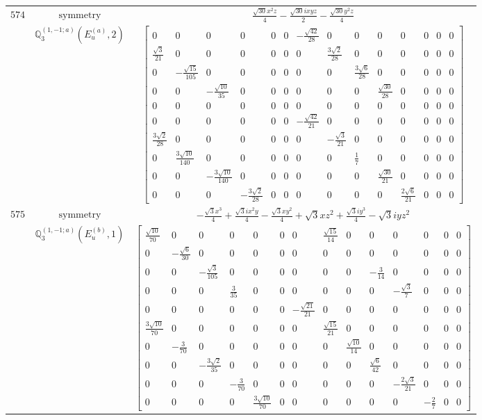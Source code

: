 \documentclass[fleqn,8pt,landscape]{jsarticle}
\begin{document}
\begin{longtable}{ccc}
$ 574 $ & $ \text{symmetry} $ & $ \frac{\sqrt{30} x^{2} z}{4} - \frac{\sqrt{30} i x y z}{2} - \frac{\sqrt{30} y^{2} z}{4} $ \\
$  $ & $ \mathbb{Q}_{3}^{(1,-1;a)}(E_{u}^{(a)},2) $ & $ \begin{bmatrix} 0 & 0 & 0 & 0 & 0 & 0 & - \frac{\sqrt{42}}{28} & 0 & 0 & 0 & 0 & 0 & 0 & 0 \\ \frac{\sqrt{3}}{21} & 0 & 0 & 0 & 0 & 0 & 0 & \frac{3 \sqrt{2}}{28} & 0 & 0 & 0 & 0 & 0 & 0 \\ 0 & - \frac{\sqrt{15}}{105} & 0 & 0 & 0 & 0 & 0 & 0 & \frac{3 \sqrt{6}}{28} & 0 & 0 & 0 & 0 & 0 \\ 0 & 0 & - \frac{\sqrt{10}}{35} & 0 & 0 & 0 & 0 & 0 & 0 & \frac{\sqrt{30}}{28} & 0 & 0 & 0 & 0 \\ 0 & 0 & 0 & 0 & 0 & 0 & 0 & 0 & 0 & 0 & 0 & 0 & 0 & 0 \\ 0 & 0 & 0 & 0 & 0 & 0 & - \frac{\sqrt{42}}{21} & 0 & 0 & 0 & 0 & 0 & 0 & 0 \\ \frac{3 \sqrt{2}}{28} & 0 & 0 & 0 & 0 & 0 & 0 & - \frac{\sqrt{3}}{21} & 0 & 0 & 0 & 0 & 0 & 0 \\ 0 & \frac{3 \sqrt{10}}{140} & 0 & 0 & 0 & 0 & 0 & 0 & \frac{1}{7} & 0 & 0 & 0 & 0 & 0 \\ 0 & 0 & - \frac{3 \sqrt{10}}{140} & 0 & 0 & 0 & 0 & 0 & 0 & \frac{\sqrt{30}}{21} & 0 & 0 & 0 & 0 \\ 0 & 0 & 0 & - \frac{3 \sqrt{2}}{28} & 0 & 0 & 0 & 0 & 0 & 0 & \frac{2 \sqrt{6}}{21} & 0 & 0 & 0 \end{bmatrix} $ \\ \hline
$ 575 $ & $ \text{symmetry} $ & $ - \frac{\sqrt{3} x^{3}}{4} + \frac{\sqrt{3} i x^{2} y}{4} - \frac{\sqrt{3} x y^{2}}{4} + \sqrt{3} x z^{2} + \frac{\sqrt{3} i y^{3}}{4} - \sqrt{3} i y z^{2} $ \\
$  $ & $ \mathbb{Q}_{3}^{(1,-1;a)}(E_{u}^{(b)},1) $ & $ \begin{bmatrix} \frac{\sqrt{10}}{70} & 0 & 0 & 0 & 0 & 0 & 0 & \frac{\sqrt{15}}{14} & 0 & 0 & 0 & 0 & 0 & 0 \\ 0 & - \frac{\sqrt{6}}{30} & 0 & 0 & 0 & 0 & 0 & 0 & 0 & 0 & 0 & 0 & 0 & 0 \\ 0 & 0 & - \frac{\sqrt{3}}{105} & 0 & 0 & 0 & 0 & 0 & 0 & - \frac{3}{14} & 0 & 0 & 0 & 0 \\ 0 & 0 & 0 & \frac{3}{35} & 0 & 0 & 0 & 0 & 0 & 0 & - \frac{\sqrt{3}}{7} & 0 & 0 & 0 \\ 0 & 0 & 0 & 0 & 0 & 0 & - \frac{\sqrt{21}}{21} & 0 & 0 & 0 & 0 & 0 & 0 & 0 \\ \frac{3 \sqrt{10}}{70} & 0 & 0 & 0 & 0 & 0 & 0 & \frac{\sqrt{15}}{21} & 0 & 0 & 0 & 0 & 0 & 0 \\ 0 & - \frac{3}{70} & 0 & 0 & 0 & 0 & 0 & 0 & \frac{\sqrt{10}}{14} & 0 & 0 & 0 & 0 & 0 \\ 0 & 0 & - \frac{3 \sqrt{2}}{35} & 0 & 0 & 0 & 0 & 0 & 0 & \frac{\sqrt{6}}{42} & 0 & 0 & 0 & 0 \\ 0 & 0 & 0 & - \frac{3}{70} & 0 & 0 & 0 & 0 & 0 & 0 & - \frac{2 \sqrt{3}}{21} & 0 & 0 & 0 \\ 0 & 0 & 0 & 0 & \frac{3 \sqrt{10}}{70} & 0 & 0 & 0 & 0 & 0 & 0 & - \frac{2}{7} & 0 & 0 \end{bmatrix} $ \\ \hline

\end{longtable}
\end{document}
